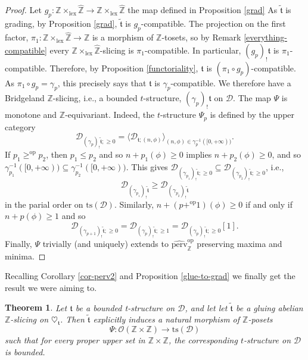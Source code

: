 \documentclass{article}
\newtheorem{thm}{Theorem}[section]
\theoremstyle{definition}
\newcommand{\Z}{\mathbb{Z}}
\newcommand{\Oo}{\mathcal{O}}
\newcommand{\ts}{\mathrm{ts}}
\newcommand{\tee}{\mathfrak{t}}
\begin{document}
\begin{proof}
Let $g_p\colon \mathbb{Z} \times_{\mathrm{lex}} \hat{\mathbb{Z}}\to \mathbb{Z} \times_{\mathrm{lex}} \hat{\mathbb{Z}}$ the map defined in Proposition \ref{grad}
As $\tilde{\tee}$ is grading, by Proposition \ref{grad}, $\tilde{\tee}$ is $g_p$-compatible. The projection on the first factor, $\pi_1\colon  \mathbb{Z} \times_{\mathrm{lex}} \hat{\mathbb{Z}}\to \Z$ is a morphism of $\Z$-tosets, so by Remark \ref{everything-compatible} every $\mathbb{Z} \times_{\mathrm{lex}} \hat{\mathbb{Z}}$-slicing is $\pi_1$-compatible. In particular, $(g_p)_!\tee$ is $\pi_1$-compatible. Therefore, by Proposition \ref{functoriality}, $\tee$ is $(\pi_1\circ g_p)$-compatible. As $\pi_1\circ g_p=\gamma_p$, this precisely says that $\tee$ is $\gamma_p$-compatible. We therefore have a Bridgeland $\Z$-slicing, i.e., a bounded $t$-structure, $(\gamma_p)_!\tee$ on $\mathscr{D}$. The map $\Psi$ is monotone and $\Z$-equivariant. Indeed, the $t$-structure $\Psi_p$ is defined by the upper category
\[
\mathscr{D}_{(\gamma_{p})_!\tilde{\tee};\geq 0}=\langle \mathscr{D}_{\tee;(n,\phi)}\rangle_{(n,\phi)\in \gamma_p^{-1}([0,+\infty))}.
\]
If $p_1\geq^{\mathrm{op}} p_2$, then  $p_1\leq p_2$ and so $n+p_1(\phi)\geq 0$ implies $n+p_2(\phi)\geq 0$, and so $\gamma_{p_1}^{-1}([0,+\infty))\subseteq \gamma_{p_2}^{-1}([0,+\infty))$. This gives $\mathscr{D}_{(\gamma_{p_1})_!\tilde{\tee};\geq 0}\subseteq \mathscr{D}_{(\gamma_{p_2})_!\tilde{\tee};\geq 0}$, i.e.,
\[
\mathscr{D}_{(\gamma_{p_1})_!\tilde{\tee}}\geq \mathscr{D}_{(\gamma_{p_2})_!\tilde{\tee}}
\]
in the parial order on  $\ts(\mathscr{D})$. Similarly, $n+(p+^{\mathrm{op}}1)(\phi)\geq 0$ if and only if $n+p(\phi)\geq 1$ and so
\[
\mathscr{D}_{(\gamma_{p+1})_!\tilde{\tee};\geq 0}=\mathscr{D}_{(\gamma_{p})_!\tilde{\tee};\geq 1}=\mathscr{D}_{(\gamma_{p})_!\tilde{\tee};\geq 0}[1].
\]
Finally, $\Psi$ trivially (and uniquely) extends to $\widehat{\mathrm{perv}}_\Z^{\mathrm{op}}$ preserving maxima and minima.
\end{proof}
Recalling Corollary \ref{cor-perv2} and Proposition \ref{glue-to-grad} we finally get the result we were aiming to.
\begin{thm}\label{main-thm}
Let $\mathfrak{t}$ be a bounded t-structure on $\mathscr{D}$, and let let $\tilde{\tee}$ be a gluing abelian $\mathbb{Z}$-slicing on $\heartsuit_{\mathfrak{t}}$. Then $\tilde{\tee}$ explicitly induces a natural morphism of $\Z$-posets
\[
\Psi\colon\Oo(\Z\times\Z)\to \ts(\mathscr{D})
\]
such that for every proper upper set in $\Z\times \Z$, the corresponding $t$-structure on $\mathscr{D}$ is bounded. 
\end{thm}
\end{document}
